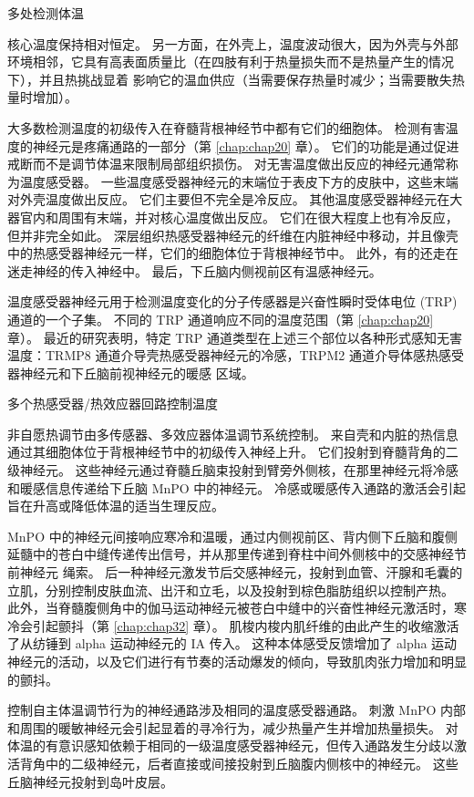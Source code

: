 多处检测体温

核心温度保持相对恒定。 另一方面，在外壳上，温度波动很大，因为外壳与外部环境相邻，它具有高表面质量比（在四肢有利于热量损失而不是热量产生的情况下），并且热挑战显着 影响它的温血供应（当需要保存热量时减少；当需要散失热量时增加）。

大多数检测温度的初级传入在脊髓背根神经节中都有它们的细胞体。 检测有害温度的神经元是疼痛通路的一部分（第 \ref{chap:chap20} 章）。 它们的功能是通过促进戒断而不是调节体温来限制局部组织损伤。 对无害温度做出反应的神经元通常称为温度感受器。 一些温度感受器神经元的末端位于表皮下方的皮肤中，这些末端对外壳温度做出反应。 它们主要但不完全是冷反应。 其他温度感受器神经元在大器官内和周围有末端，并对核心温度做出反应。 它们在很大程度上也有冷反应，但并非完全如此。 深层组织热感受器神经元的纤维在内脏神经中移动，并且像壳中的热感受器神经元一样，它们的细胞体位于背根神经节中。 此外，有的还走在迷走神经的传入神经中。 最后，下丘脑内侧视前区有温感神经元。

温度感受器神经元用于检测温度变化的分子传感器是兴奋性瞬时受体电位 (TRP) 通道的一个子集。 不同的 TRP 通道响应不同的温度范围（第 \ref{chap:chap20} 章）。 最近的研究表明，特定 TRP 通道类型在上述三个部位以各种形式感知无害温度：TRMP8 通道介导壳热感受器神经元的冷感，TRPM2 通道介导体感热感受器神经元和下丘脑前视神经元的暖感 区域。

多个热感受器/热效应器回路控制温度

非自愿热调节由多传感器、多效应器体温调节系统控制。 来自壳和内脏的热信息通过其细胞体位于背根神经节中的初级传入神经上升。 它们投射到脊髓背角的二级神经元。 这些神经元通过脊髓丘脑束投射到臂旁外侧核，在那里神经元将冷感和暖感信息传递给下丘脑 MnPO 中的神经元。 冷感或暖感传入通路的激活会引起旨在升高或降低体温的适当生理反应。

MnPO 中的神经元间接响应寒冷和温暖，通过内侧视前区、背内侧下丘脑和腹侧延髓中的苍白中缝传递传出信号，并从那里传递到脊柱中间外侧核中的交感神经节前神经元 绳索。 后一种神经元激发节后交感神经元，投射到血管、汗腺和毛囊的立肌，分别控制皮肤血流、出汗和立毛，以及投射到棕色脂肪组织以控制产热。 此外，当脊髓腹侧角中的伽马运动神经元被苍白中缝中的兴奋性神经元激活时，寒冷会引起颤抖（第 \ref{chap:chap32} 章）。 肌梭内梭内肌纤维的由此产生的收缩激活了从纺锤到 alpha 运动神经元的 IA 传入。 这种本体感受反馈增加了 alpha 运动神经元的活动，以及它们进行有节奏的活动爆发的倾向，导致肌肉张力增加和明显的颤抖。

控制自主体温调节行为的神经通路涉及相同的温度感受器通路。 刺激 MnPO 内部和周围的暖敏神经元会引起显着的寻冷行为，减少热量产生并增加热量损失。 对体温的有意识感知依赖于相同的一级温度感受器神经元，但传入通路发生分歧以激活背角中的二级神经元，后者直接或间接投射到丘脑腹内侧核中的神经元。 这些丘脑神经元投射到岛叶皮层。

